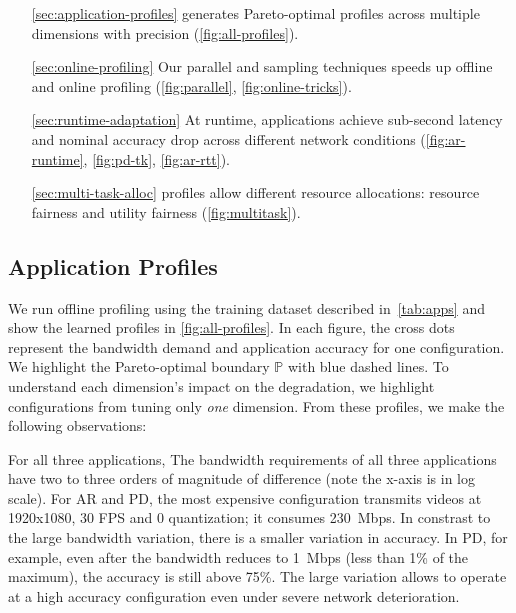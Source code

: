 \begin{itemize}[itemsep=0pt, topsep=3pt]
\item[\autoref{sec:application-profiles}] \sysname{} generates Pareto-optimal
  profiles across multiple dimensions with precision
  (\autoref{fig:all-profiles}).
\item[\autoref{sec:online-profiling}] Our parallel and sampling techniques
  speeds up offline and online profiling (\autoref{fig:parallel},
  \autoref{fig:online-tricks}).
\item[\autoref{sec:runtime-adaptation}] At runtime, \sysname{} applications
  achieve sub-second latency and nominal accuracy drop across different network
  conditions (\autoref{fig:ar-runtime}, \autoref{fig:pd-tk},
  \autoref{fig:ar-rtt}).
\item[\autoref{sec:multi-task-alloc}] \sysname{} profiles allow different
  resource allocations: resource fairness and utility fairness
  (\autoref{fig:multitask}).
\end{itemize}

\subsection{Application Profiles}
\label{sec:application-profiles}

We run offline profiling using the training dataset described
in~\autoref{tab:apps} and show the learned profiles in
\autoref{fig:all-profiles}. In each figure, the cross dots represent the
bandwidth demand and application accuracy for one configuration. We highlight
the Pareto-optimal boundary $\mathbb{P}$ with blue dashed lines. To understand
each dimension's impact on the degradation, we highlight configurations from
tuning only \textit{one} dimension. From these profiles, we make the following
observations:

 For all three applications, The bandwidth
requirements of all three applications have two to three orders of magnitude of
difference (note the x-axis is in log scale). For AR and PD, the most expensive
configuration transmits videos at 1920x1080, 30 FPS and 0 quantization; it
consumes \SI{230}{Mbps}. In constrast to the large bandwidth variation, there is
a smaller variation in accuracy. In PD, for example, even after the bandwidth
reduces to \SI{1}{Mbps} (less than 1\% of the maximum), the accuracy is still
above 75\%. The large variation allows \sysname{} to operate at a high accuracy
configuration even under severe network deterioration.

